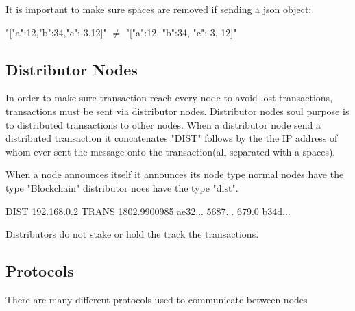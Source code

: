 \documentclass[11pt]{article}
\begin{document}
It is important to make sure spaces are removed if sending a json object:

\begin{center}
"[{"a":12,"b":34,"c":-3},12]" $\neq$ "[{"a":12, "b":34, "c":-3}, 12]"
\end{center}

\subsection{Distributor Nodes}
In order to make sure transaction reach every node to avoid lost transactions, transactions must be sent via distributor nodes. Distributor nodes soul purpose is to distributed transactions to other nodes. When a distributor node send a distributed transaction it concatenates "DIST" follows by the the IP address of whom ever sent the message onto the transaction(all separated with a spaces).

When a node announces itself it announces its node type normal nodes have the type "Blockchain" distributor noes have the type "dist".

\begin{center}
DIST\hspace{0.1cm} 192.168.0.2\hspace{0.1cm} TRANS\hspace{0.1cm} 1802.9900985 \hspace{0.1cm} ae32... \hspace{0.1cm} 5687... \hspace{0.1cm}  679.0 \hspace{0.1cm} b34d...
\end{center}

Distributors do not stake or hold the track the transactions.

\subsection{Protocols}
There are many different protocols used to communicate between nodes
\end{document}

